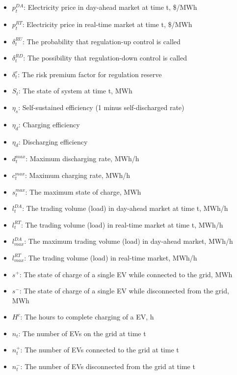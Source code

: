 \begin{itemize}
	\item $p_t^{DA}$: Electricity price in day-ahead market at time t, \$/MWh
	\item $p_t^{RT}$: Electricity price in real-time market at time t, \$/MWh
	\item $\delta_t^{RU}$: The probability that regulation-up control is called
	\item $\delta_t^{RD}$: The possibility that regulation-down control is called
	\item $\delta_t^r$: The risk premium factor for regulation reserve
	\item $S_t$: The state of system at time t, MWh
	\item $\eta_s$: Self-sustained efficiency (1 minus self-discharged rate)
	\item $\eta_d$: Charging efficiency
	\item $\eta_d$: Discharging efficiency
	\item $d_t^{max}$: Maximum discharging rate, MWh/h
	\item $c_t^{max}$: Maximum charging rate, MWh/h
	\item $s_t^{max}$: The maximum state of charge, MWh
	\item $l_t^{DA}$: The trading volume (load) in day-ahead market at time t, MWh/h
	\item $l_t^{RT}$: The trading volume (load) in real-time market at time t, MWh/h
	\item $l_{max}^{DA}$: The maximum trading volume (load) in day-ahead market, MWh/h
	\item $l_{max}^{RT}$: The trading volume (load) in real-time market, MWh/h
	\item $s^+$: The state of charge of a single EV while connected to the grid, MWh
	\item $s^-$: The state of charge of a single EV while disconnected from the grid, MWh
	\item $H^c$: The hours to complete charging of a EV, h
	\item $n_t$: The number of EVs on the grid at time t
	\item $n_t^+$: The number of EVs connected to the grid at time t
	\item $n_t^-$: The number of EVs disconnected from the grid at time t
	
\end{itemize}
